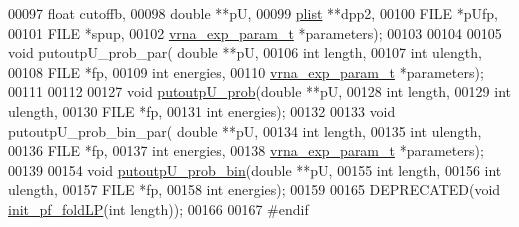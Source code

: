 \begin{DoxyCode}
00097                     \textcolor{keywordtype}{float} cutoffb,
00098                     \textcolor{keywordtype}{double} **pU,
00099                     \mbox{\hyperlink{group__data__structures_structvrna__plist__s}{plist}} **dpp2,
00100                     FILE *pUfp,
00101                     FILE *spup,
00102                     \mbox{\hyperlink{group__energy__parameters_structvrna__exp__param__s}{vrna\_exp\_param\_t}} *parameters);
00103 
00104 
00105 \textcolor{keywordtype}{void} putoutpU\_prob\_par( \textcolor{keywordtype}{double} **pU,
00106                         \textcolor{keywordtype}{int} length,
00107                         \textcolor{keywordtype}{int} ulength,
00108                         FILE *fp,
00109                         \textcolor{keywordtype}{int} energies,
00110                         \mbox{\hyperlink{group__energy__parameters_structvrna__exp__param__s}{vrna\_exp\_param\_t}} *parameters);
00111 
00112 
00127 \textcolor{keywordtype}{void}    \mbox{\hyperlink{group__local__pf__fold_ga0bcb751860bbf34e3dfee8c2fbdb3ef3}{putoutpU\_prob}}(\textcolor{keywordtype}{double} **pU,
00128                       \textcolor{keywordtype}{int} length,
00129                       \textcolor{keywordtype}{int} ulength,
00130                       FILE *fp,
00131                       \textcolor{keywordtype}{int} energies);
00132 
00133 \textcolor{keywordtype}{void} putoutpU\_prob\_bin\_par( \textcolor{keywordtype}{double} **pU,
00134                             \textcolor{keywordtype}{int} length,
00135                             \textcolor{keywordtype}{int} ulength,
00136                             FILE *fp,
00137                             \textcolor{keywordtype}{int} energies,
00138                             \mbox{\hyperlink{group__energy__parameters_structvrna__exp__param__s}{vrna\_exp\_param\_t}} *parameters);
00139 
00154 \textcolor{keywordtype}{void}    \mbox{\hyperlink{group__local__pf__fold_ga9acb00ee10e96b1ca4ea394cd8bcec75}{putoutpU\_prob\_bin}}(\textcolor{keywordtype}{double} **pU,
00155                           \textcolor{keywordtype}{int} length,
00156                           \textcolor{keywordtype}{int} ulength,
00157                           FILE *fp,
00158                           \textcolor{keywordtype}{int} energies);
00159 
00165 DEPRECATED(\textcolor{keywordtype}{void} \mbox{\hyperlink{LPfold_8h_ae85bf55053e9fb295208be322e0fa07a}{init\_pf\_foldLP}}(\textcolor{keywordtype}{int} length));
00166 
00167 \textcolor{preprocessor}{#endif}
\end{DoxyCode}
